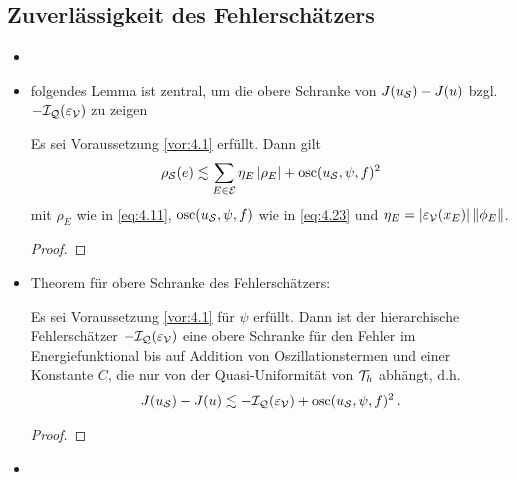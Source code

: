 \subsection{Zuverlässigkeit des Fehlerschätzers}
\label{kap:4.1.4}

\begin{itemize}
\item 

\item folgendes Lemma ist zentral, um die obere Schranke von $J(u_{\mathcal S})-J(u)$ bzgl. $-\mathcal I_{\mathcal Q}(\varepsilon_{\mathcal V})$ zu zeigen

\begin{lemma}
Es sei Voraussetzung \ref{vor:4.1} erfüllt. Dann gilt
\begin{align}
	\rho_{\mathcal S}(e) \lesssim \sum_{E\in \mathcal E} \eta_E \, \lvert \rho_E\rvert + \operatorname{osc}(u_{\mathcal S},\psi,f)^2 
\end{align}
mit $\rho_E$ wie in \eqref{eq:4.11}, $\operatorname{osc} (u_{\mathcal S},\psi,f)$ wie in \eqref{eq:4.23} und $\eta_E = \lvert \varepsilon_{\mathcal V}(x_E)\rvert \, \lVert \phi_E\rVert$.
\end{lemma}

\begin{proof}

\end{proof}




\item Theorem für obere Schranke des Fehlerschätzers:
\begin{theorem}
Es sei Voraussetzung \ref{vor:4.1} für $\psi$ erfüllt. Dann ist der hierarchische Fehlerschätzer $-\mathcal I_{\mathcal Q}(\varepsilon_{\mathcal V})$ eine obere Schranke für den Fehler im Energiefunktional bis auf Addition von Oszillationstermen und einer Konstante $C$, die nur von der Quasi-Uniformität von $\mathcal T_h$ abhängt, d.h.
\begin{align}
	J(u_{\mathcal S}) - J(u) \lesssim -\mathcal I_{\mathcal Q}(\varepsilon_{\mathcal V}) + \operatorname{osc} (u_{\mathcal S},\psi,f)^2 \, .
\end{align}
\end{theorem}

\begin{proof}

\end{proof}


\item
\end{itemize}






